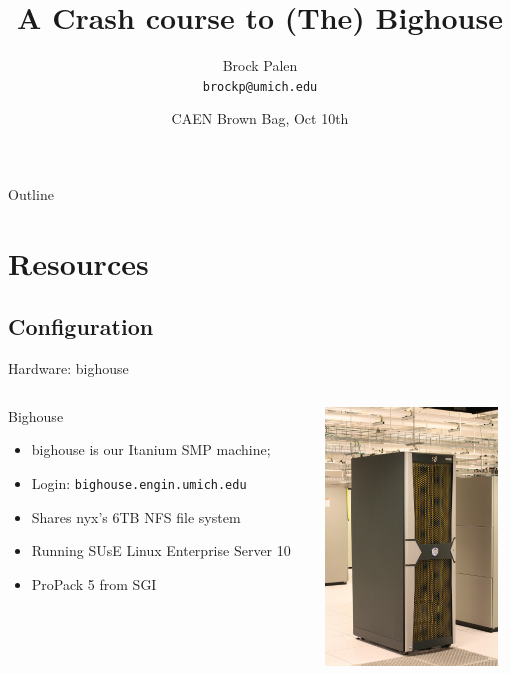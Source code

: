 \documentclass{beamer}
\title[Bighouse Crash] {A Crash course to (The) Bighouse}
\author{Brock Palen\\ \texttt{brockp@umich.edu}}
\date{CAEN Brown Bag, Oct 10th}
\begin{document}
  \begin{frame}
    \titlepage
  \end{frame}

  \begin{frame}{Outline}
    \tableofcontents
  \end{frame}
  
  \section{Resources}
  \subsection {Configuration}
  \begin{frame}{Hardware: bighouse}
   \begin{columns}[c]
    \begin{column}{7cm}
    \begin{block}{Bighouse}
    \begin{itemize}
      \item bighouse is our Itanium SMP machine;
      \item Login: \texttt{bighouse.engin.umich.edu}
      \item Shares nyx's 6TB NFS file system
      \item Running SUsE Linux Enterprise Server 10
      \item ProPack 5 from SGI
    \end{itemize}
   \end{block}
   \end{column}
   \begin{column}{5cm}
    \begin{center}\includegraphics[height=2.7in]{tallbighouse}\end{center}
   \end{column}
   \end{columns}
  \end{frame}
\end{document}
